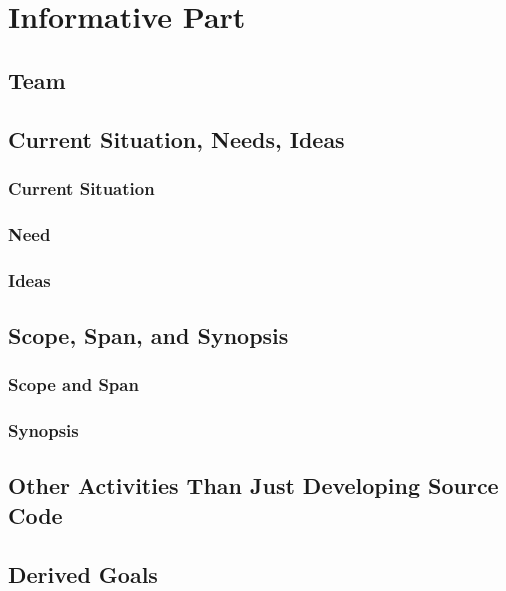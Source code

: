 \chapter{Informative Part}
\section{Team}
\section{Current Situation, Needs, Ideas}
\subsection{Current Situation}
\subsection{Need}
\subsection{Ideas}
\newpage
\section{Scope, Span, and Synopsis}
\subsection{Scope and Span}
\subsection{Synopsis}
\newpage
\section{Other Activities Than Just Developing Source Code}
\section{Derived Goals}
